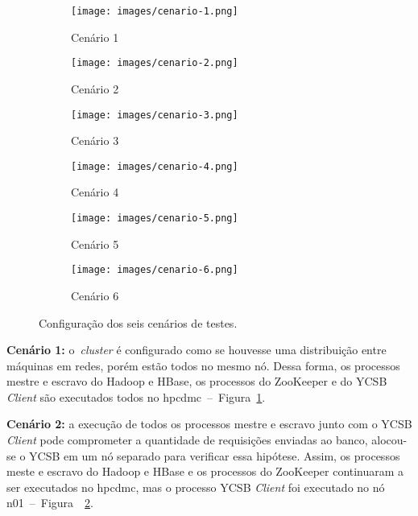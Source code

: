 \documentclass[12pt]{article}
\begin{document}
\begin{figure}
	\centering
	\hspace{0.2cm}
    \begin{subfigure}{0.2\textwidth}
    	\centering
        \texttt{[image: images/cenario-1.png]}
        \caption{Cenário 1}
        \label{figura2a}
    \end{subfigure}
    \hspace{0.3cm}
    \begin{subfigure}{0.3\textwidth}   
    	\centering
        \texttt{[image: images/cenario-2.png]}
        \caption{Cenário 2}%
        \label{figura2b}
    \end{subfigure}
    \hspace{0.4cm}
    \begin{subfigure}{0.3\textwidth}
    	\centering
        \texttt{[image: images/cenario-3.png]}
        \caption{Cenário 3}
        \label{figura2c}
    \end{subfigure}
    \medskip
    \begin{subfigure}{0.3\textwidth}   
    	\centering
        \texttt{[image: images/cenario-4.png]}
        \caption{Cenário 4}%
        \label{figura2d}
    \end{subfigure}
    \begin{subfigure}{0.3\textwidth}
    	\centering
        \texttt{[image: images/cenario-5.png]}
        \caption{Cenário 5}
        \label{figura2e}
    \end{subfigure}
    \begin{subfigure}{0.35\textwidth}   
    	\centering
        \texttt{[image: images/cenario-6.png]}
        \caption{Cenário 6}%
        \label{figura2f}
    \end{subfigure}
    \caption{Configuração dos seis cenários de testes.}
\end{figure}

\textbf{Cenário 1:} o~\emph{cluster} é configurado como se houvesse uma distribuição entre máquinas em redes, porém estão todos no mesmo nó. 
Dessa forma, os processos mestre e escravo do Hadoop e HBase, os processos do ZooKeeper e do YCSB \emph{Client} são executados todos no hpcdmc~--~Figura~\ref{figura2a}.

\textbf{Cenário 2:} a execução de todos os processos mestre e escravo junto com o YCSB \emph{Client} pode comprometer a quantidade de requisições enviadas ao banco, alocou-se o YCSB em um nó separado para verificar essa hipótese. 
Assim, os processos meste e escravo do Hadoop e HBase e os processos do ZooKeeper continuaram a ser executados no hpcdmc, mas o processo YCSB \emph{Client} foi executado no nó n01~--~Figura~~\ref{figura2b}.
\end{document}
